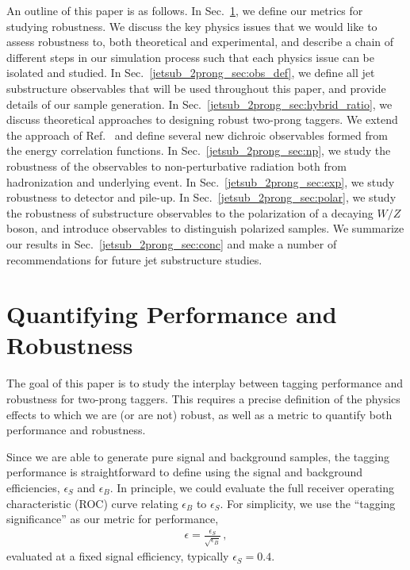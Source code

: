 \documentclass[11pt]{cernrep}
\begin{document}
An outline of this paper is as follows.
%
In Sec.~\ref{jetsub_2prong_sec:pres}, we define our metrics for studying robustness.
%
We discuss the key physics issues that we would like to assess robustness to, both theoretical and experimental, and describe a chain of different steps in our simulation process such that each physics issue can be isolated and studied.
%
In Sec.~\ref{jetsub_2prong_sec:obs_def}, we define all jet substructure observables that will be used throughout this paper, and  provide details of our sample generation.
%
In Sec.~\ref{jetsub_2prong_sec:hybrid_ratio}, we discuss theoretical approaches to designing robust two-prong taggers.
%
We extend the approach of Ref.~\cite{Salam:2016yht} and define several new dichroic observables formed from the energy correlation functions.  
%
In Sec.~\ref{jetsub_2prong_sec:np}, we study the robustness of the observables to non-perturbative radiation both from hadronization and underlying event.
%
In Sec.~\ref{jetsub_2prong_sec:exp}, we study robustness to detector and pile-up.
%
In Sec.~\ref{jetsub_2prong_sec:polar}, we study the robustness of substructure observables to the polarization of a decaying $W/Z$ boson, and introduce observables to distinguish polarized samples.
%
We summarize our results in Sec.~\ref{jetsub_2prong_sec:conc} and make a number of recommendations for future jet substructure studies.

\section{Quantifying Performance and Robustness}\label{jetsub_2prong_sec:pres}


The goal of this paper is to study the interplay between tagging performance and robustness for two-prong taggers.
%
This requires a precise definition of the physics effects to which we are (or are not) robust, as well as a metric to quantify both performance and robustness.


Since we are able to generate pure signal and background samples, the tagging performance is straightforward to define using the signal and background efficiencies, $\epsilon_S$ and $\epsilon_B$.
%
In principle, we could evaluate the full receiver operating characteristic (ROC) curve relating $\epsilon_B$ to $\epsilon_S$.
%
For simplicity, we use the ``tagging significance'' as our metric for performance,
\begin{align}\label{eq:significance}
\epsilon=\frac{\epsilon_S}{\sqrt{\epsilon_B}}\,,
\end{align}
evaluated at a fixed signal efficiency, typically $\epsilon_S = 0.4$.
\end{document}

